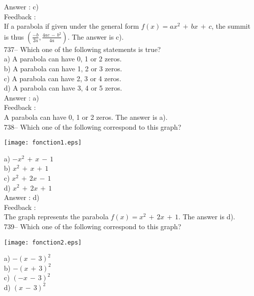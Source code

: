 \documentclass[letterpaper, 12pt]{article}
\begin{document}
Answer : c)\\

Feedback : \\
If a parabola if given under the general form 
$f(x)=ax^{2}\,+\,bx\,+\,c$, the summit is thus
$(\frac{-b}{2a},\frac{4ac\,-\,b^{2}}{4a})$.  The answer is c).\\

737-- Which one of the following statements is true?\\
a) A parabola can have  0, 1 or 2 zeros.\\
b) A parabola can have  1, 2 or 3 zeros.\\
c) A parabola can have  2, 3 or 4 zeros.\\
d) A parabola can have  3, 4 or 5 zeros.\\

Answer : a)\\

Feedback : \\
A parabola can have  0, 1 or 2 zeros.  The answer is a).\\

738-- Which one of the following correspond to this graph?\\
    \begin{center}
    \texttt{[image: fonction1.eps]}
    \end{center}

a) $-x^{2}\,+\,x\,-\,1$\\
b) $x^{2}\,+\,x\,+\,1$\\
c) $x^{2}\,+\,2x\,-\,1$\\
d) $x^{2}\,+\,2x\,+\,1$\\

Answer : d)\\

Feedback : \\
The graph represents the parabola $f(x)=x^{2}\,+\,2x\,+\,1$. The answer is d).\\

739-- Which one of the following correspond to this graph?\\
    \begin{center}
    \texttt{[image: fonction2.eps]}
    \end{center}

a) $-(x\,-\,3)^{2}$\\
b) $-(x\,+\,3)^{2}$\\
c) $(-x\,-\,3)^{2}$\\
d) $(x\,-\,3)^{2}$\\
\end{document}
